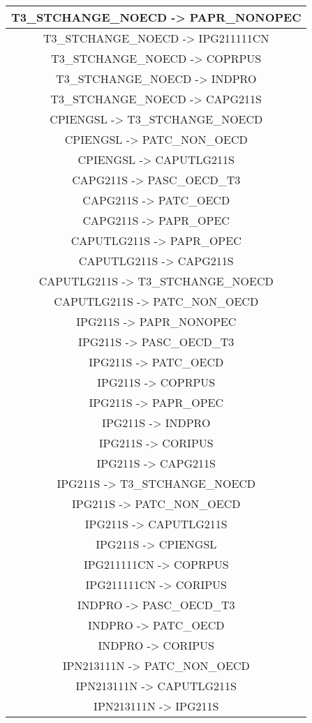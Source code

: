 \begin{table}[h]
\begin{scriptsize}
\begin{tabular}{c}
\hline
T3_STCHANGE_NOECD -> PAPR_NONOPEC \\
\hline
T3_STCHANGE_NOECD -> IPG211111CN \\
\hline
T3_STCHANGE_NOECD -> COPRPUS \\
\hline
T3_STCHANGE_NOECD -> INDPRO \\
\hline
T3_STCHANGE_NOECD -> CAPG211S \\
\hline
CPIENGSL -> T3_STCHANGE_NOECD \\
\hline
CPIENGSL -> PATC_NON_OECD \\
\hline
CPIENGSL -> CAPUTLG211S \\
\hline
CAPG211S -> PASC_OECD_T3 \\
\hline
CAPG211S -> PATC_OECD \\
\hline
CAPG211S -> PAPR_OPEC \\
\hline
CAPUTLG211S -> PAPR_OPEC \\
\hline
CAPUTLG211S -> CAPG211S \\
\hline
CAPUTLG211S -> T3_STCHANGE_NOECD \\
\hline
CAPUTLG211S -> PATC_NON_OECD \\
\hline
IPG211S -> PAPR_NONOPEC \\
\hline
IPG211S -> PASC_OECD_T3 \\
\hline
IPG211S -> PATC_OECD \\
\hline
IPG211S -> COPRPUS \\
\hline
IPG211S -> PAPR_OPEC \\
\hline
IPG211S -> INDPRO \\
\hline
IPG211S -> CORIPUS \\
\hline
IPG211S -> CAPG211S \\
\hline
IPG211S -> T3_STCHANGE_NOECD \\
\hline
IPG211S -> PATC_NON_OECD \\
\hline
IPG211S -> CAPUTLG211S \\
\hline
IPG211S -> CPIENGSL \\
\hline
IPG211111CN -> COPRPUS \\
\hline
IPG211111CN -> CORIPUS \\
\hline
INDPRO -> PASC_OECD_T3 \\
\hline
INDPRO -> PATC_OECD \\
\hline
INDPRO -> CORIPUS \\
\hline
IPN213111N -> PATC_NON_OECD \\
\hline
IPN213111N -> CAPUTLG211S \\
\hline
IPN213111N -> IPG211S \\

\end{tabular}
\end{scriptsize}
\end{table}
